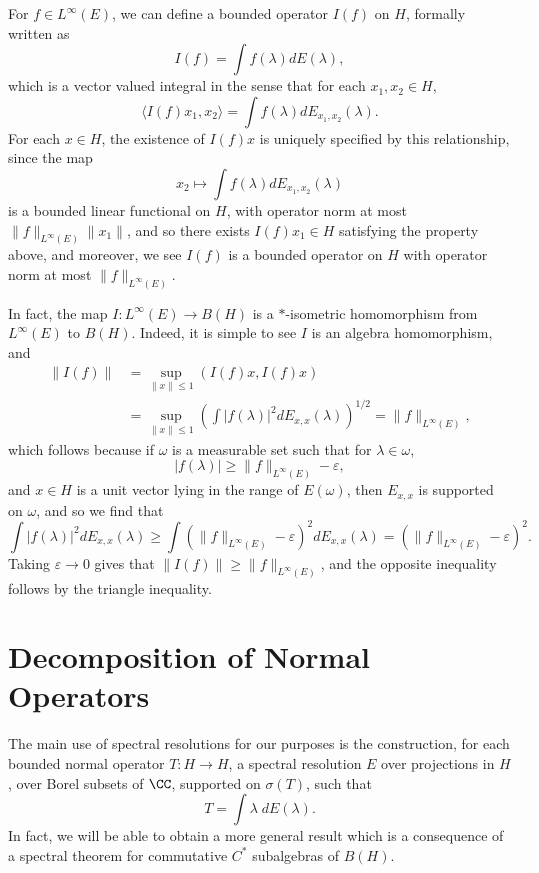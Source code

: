 For $f \in L^\infty(E)$, we can define a bounded operator $I(f)$ on $H$, formally written as
%
\[ I(f) = \int f(\lambda) dE(\lambda), \]
%
which is a vector valued integral in the sense that for each $x_1,x_2 \in H$,
%
\[ \langle I(f) x_1, x_2 \rangle = \int f(\lambda) dE_{x_1,x_2}(\lambda). \]
%
For each $x \in H$, the existence of $I(f) x$ is uniquely specified by this relationship, since the map
%
\[ x_2 \mapsto \int f(\lambda) dE_{x_1,x_2}(\lambda) \]
%
is a bounded linear functional on $H$, with operator norm at most $\| f \|_{L^\infty(E)} \| x_1 \|$, and so there exists $I(f) x_1 \in H$ satisfying the property above, and moreover, we see $I(f)$ is a bounded operator on $H$ with operator norm at most $\| f \|_{L^\infty(E)}$.

In fact, the map $I: L^\infty(E) \to B(H)$ is a $*$-isometric homomorphism from $L^\infty(E)$ to $B(H)$. Indeed, it is simple to see $I$ is an algebra homomorphism, and
%
\begin{align*}
    \| I(f) \| &= \sup_{\| x \| \leq 1} (I(f) x, I(f) x)\\
    &= \sup_{\| x \| \leq 1} \left( \int |f(\lambda)|^2 dE_{x,x}(\lambda) \right)^{1/2} = \| f \|_{L^\infty(E)},
\end{align*}
%
which follows because if $\omega$ is a measurable set such that for $\lambda \in \omega$,
%
\[ |f(\lambda)| \geq \| f \|_{L^\infty(E)} - \varepsilon, \]
%
and $x \in H$ is a unit vector lying in the range of $E(\omega)$, then $E_{x,x}$ is supported on $\omega$, and so we find that
%
\[ \int |f(\lambda)|^2 dE_{x,x}(\lambda) \geq \int \left( \| f \|_{L^\infty(E)} - \varepsilon \right)^2 dE_{x,x}(\lambda) = (\| f \|_{L^\infty(E)} - \varepsilon)^2. \]
%
Taking $\varepsilon \to 0$ gives that $\| I(f) \| \geq \| f \|_{L^\infty(E)}$, and the opposite inequality follows by the triangle inequality.

\section{Decomposition of Normal Operators}

The main use of spectral resolutions for our purposes is the construction, for each bounded normal operator $T: H \to H$, a spectral resolution $E$ over projections in $H$, over Borel subsets of $\CC$, supported on $\sigma(T)$, such that
%
\[ T = \int \lambda\; dE(\lambda). \]
%
In fact, we will be able to obtain a more general result which is a consequence of a spectral theorem for commutative $C^*$ subalgebras of $B(H)$.

